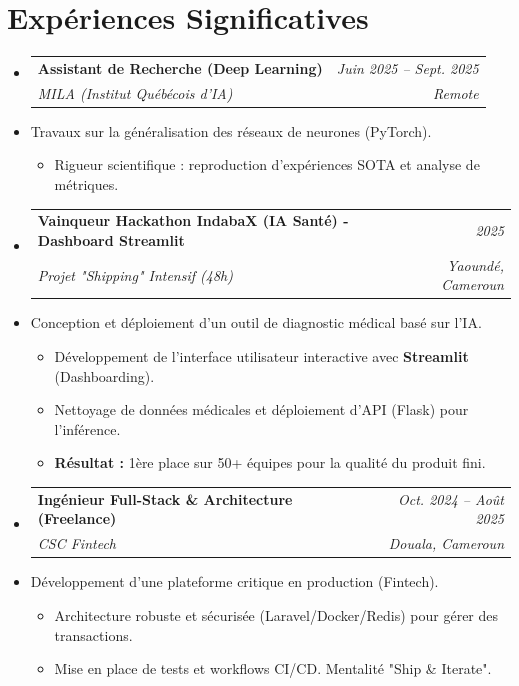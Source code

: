 \documentclass[a4paper,11pt]{article}
\makeatletter
\newcommand{\resumeItem}[1]{\item\small{#1}}
\newcommand{\resumeSubheading}[4]{
  \vspace{-1pt}\item
    \begin{tabular*}{0.97\textwidth}[t]{l@{\extracolsep{\fill}}r}
      \textbf{#1} & \textit{\small #2} \\
      \textit{\small #3} & \textit{\small #4} \\
    \end{tabular*}\vspace{-5pt}
}
\makeatother
\begin{document}
\section{Expériences Significatives}
\begin{itemize}[leftmargin=*, label={}]
    \resumeSubheading
      {Assistant de Recherche (Deep Learning)}{Juin 2025 -- Sept. 2025}
      {MILA (Institut Québécois d'IA)}{Remote}
      \resumeItem{Travaux sur la généralisation des réseaux de neurones (PyTorch).}
      \begin{itemize}[leftmargin=0.4cm, nosep, label=\tiny$\bullet$]
        \item \small{Rigueur scientifique : reproduction d'expériences SOTA et analyse de métriques.}
      \end{itemize}
          \vspace{2pt}
    \resumeSubheading
      {Vainqueur Hackathon IndabaX (IA Santé) - Dashboard Streamlit}{2025}
      {Projet "Shipping" Intensif (48h)}{Yaoundé, Cameroun}
      \resumeItem{Conception et déploiement d'un outil de diagnostic médical basé sur l'IA.}
      \begin{itemize}[leftmargin=0.4cm, nosep, label=\tiny$\bullet$]
        \item \small{Développement de l'interface utilisateur interactive avec \textbf{Streamlit} (Dashboarding).}
        \item \small{Nettoyage de données médicales et déploiement d'API (Flask) pour l'inférence.}
        \item \small{\textbf{Résultat :} 1ère place sur 50+ équipes pour la qualité du produit fini.}
      \end{itemize}
    \vspace{2pt}

    \resumeSubheading
      {Ingénieur Full-Stack \& Architecture (Freelance)}{Oct. 2024 -- Août 2025}
      {CSC Fintech}{Douala, Cameroun}
      \resumeItem{Développement d'une plateforme critique en production (Fintech).}
      \begin{itemize}[leftmargin=0.4cm, nosep, label=\tiny$\bullet$]
        \item \small{Architecture robuste et sécurisée (Laravel/Docker/Redis) pour gérer des transactions.}
        \item \small{Mise en place de tests et workflows CI/CD. Mentalité "Ship & Iterate".}
      \end{itemize}
\end{itemize}
\end{document}
